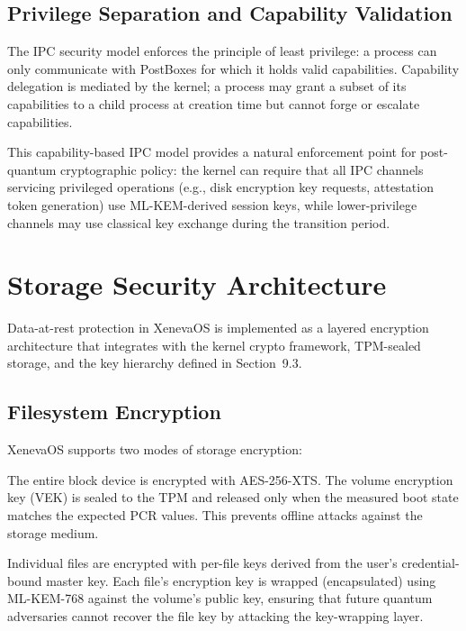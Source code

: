 \documentclass[11pt, a4paper]{article}
\begin{document}
\subsection{Privilege Separation and Capability Validation}\label{sec:ipc-privilege}

The IPC security model enforces the principle of least privilege: a process can only communicate with PostBoxes for which it holds valid capabilities. Capability delegation is mediated by the kernel; a process may grant a subset of its capabilities to a child process at creation time but cannot forge or escalate capabilities.

This capability-based IPC model provides a natural enforcement point for post-quantum cryptographic policy: the kernel can require that all IPC channels servicing privileged operations (e.g., disk encryption key requests, attestation token generation) use ML-KEM-derived session keys, while lower-privilege channels may use classical key exchange during the transition period.



\section{Storage Security Architecture}\label{sec:storage-security}

Data-at-rest protection in XenevaOS is implemented as a layered encryption architecture that integrates with the kernel crypto framework, TPM-sealed storage, and the key hierarchy defined in Section~9.3.

\subsection{Filesystem Encryption}\label{sec:fs-encryption}

XenevaOS supports two modes of storage encryption:

\begin{description}[leftmargin=0pt,style=unboxed]
\item[Full Volume Encryption (FVE).] The entire block device is encrypted with AES-256-XTS. The volume encryption key (VEK) is sealed to the TPM and released only when the measured boot state matches the expected PCR values. This prevents offline attacks against the storage medium.
\item[Per-File Encryption (PFE).] Individual files are encrypted with per-file keys derived from the user's credential-bound master key. Each file's encryption key is wrapped (encapsulated) using ML-KEM-768 against the volume's public key, ensuring that future quantum adversaries cannot recover the file key by attacking the key-wrapping layer.
\end{description}
\end{document}
